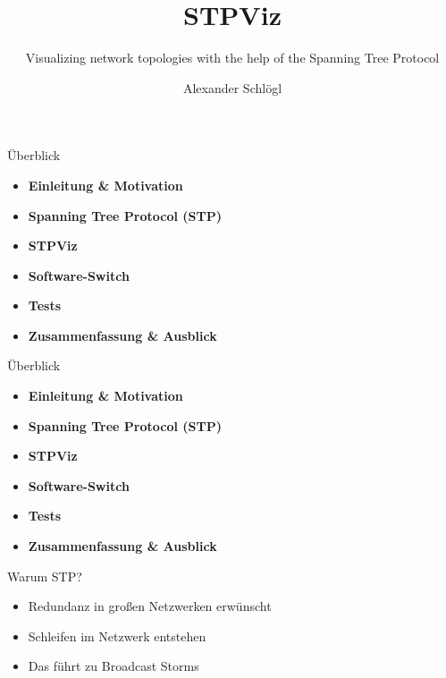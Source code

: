 \documentclass{beamer}
\title{STPViz}
\subtitle{Visualizing network topologies with the help of the Spanning Tree Protocol}
\author{Alexander Schlögl}
\begin{document}
\begin{frame}[plain]
    \maketitle
\end{frame}

\begin{frame}{Überblick}
    \begin{itemize}
        \item \textbf{Einleitung \& Motivation}
        \item \textbf{Spanning Tree Protocol (STP)}
        \item \textbf{STPViz}
        \item \textbf{Software-Switch}
        \item \textbf{Tests}
        \item \textbf{Zusammenfassung \& Ausblick}
    \end{itemize}
\end{frame}

\begin{frame}{Überblick}
    \begin{itemize}
        \item \alert{\textbf{Einleitung \& Motivation}}
        \item \textbf{Spanning Tree Protocol (STP)}
        \item \textbf{STPViz}
        \item \textbf{Software-Switch}
        \item \textbf{Tests}
        \item \textbf{Zusammenfassung \& Ausblick}
    \end{itemize}
\end{frame}

\begin{frame}{Warum STP?}
    \begin{itemize}[<+->]
        \item Redundanz in großen Netzwerken erwünscht
        \item Schleifen im Netzwerk entstehen
        \item Das führt zu Broadcast Storms
    \end{itemize}
\end{frame}
\end{document}

